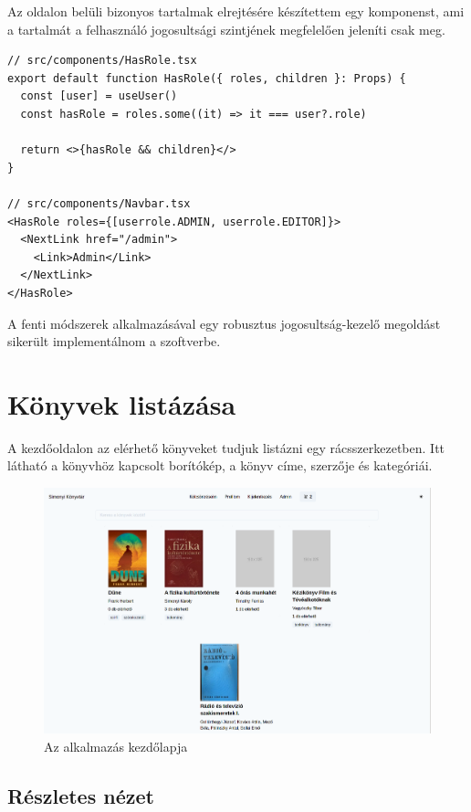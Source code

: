 Az oldalon belüli bizonyos tartalmak elrejtésére készítettem egy komponenst, ami a tartalmát a felhasználó jogosultsági szintjének
megfelelően jeleníti csak meg.

\begin{lstlisting}[caption=Authorizáció komponens és használata]
// src/components/HasRole.tsx
export default function HasRole({ roles, children }: Props) {
  const [user] = useUser()
  const hasRole = roles.some((it) => it === user?.role)

  return <>{hasRole && children}</>
}

// src/components/Navbar.tsx
<HasRole roles={[userrole.ADMIN, userrole.EDITOR]}>
  <NextLink href="/admin">
    <Link>Admin</Link>
  </NextLink>
</HasRole>
\end{lstlisting}

A fenti módszerek alkalmazásával egy robusztus jogosultság-kezelő megoldást sikerült implementálnom a szoftverbe.

\section{Könyvek listázása}

A kezdőoldalon az elérhető könyveket tudjuk listázni egy rácsszerkezetben.
Itt látható a könyvhöz kapcsolt borítókép, a könyv címe, szerzője és kategóriái.

\begin{figure}[!ht]
  \centering
  \includegraphics[width=150mm, keepaspectratio]{figures/index.png}
  \caption{Az alkalmazás kezdőlapja}
  \label{fig:IndexPage}
\end{figure}

\subsection{Részletes nézet}


